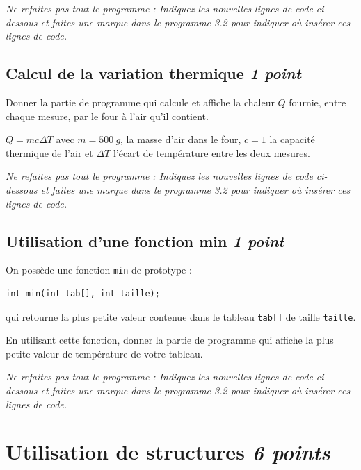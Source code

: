 \textit{Ne refaites pas tout le programme : Indiquez les nouvelles lignes de code ci-dessous et faites une marque dans le programme 3.2 pour indiquer où insérer ces lignes de code.}

\espaceReponse{4cm}

\subsection{Calcul de la variation thermique \hfill \textit{1 point}}

\UPSTIquestion
Donner la partie de programme qui calcule et affiche la chaleur $Q$ fournie, entre chaque mesure, par le four à l'air qu'il contient.


$Q = mc\Delta T$ avec $m = \SI{500}{g}$, la masse d'air dans le four, $c=1$ la capacité thermique de l'air et $\Delta T$ l'écart de température entre les deux mesures.


\textit{Ne refaites pas tout le programme : Indiquez les nouvelles lignes de code ci-dessous et faites une marque dans le programme 3.2 pour indiquer où insérer ces lignes de code.}

\espaceReponse{4cm}

\subsection{Utilisation d'une fonction min \hfill \textit{1 point}}

On possède une fonction \texttt{min} de prototype :
\begin{lstlisting}
int min(int tab[], int taille);
\end{lstlisting}
qui retourne la plus petite valeur contenue dans le tableau \texttt{tab[]} de taille \texttt{taille}.

\UPSTIquestion
En utilisant cette fonction, donner la partie de programme qui affiche la plus petite valeur de température de votre tableau.

\textit{Ne refaites pas tout le programme : Indiquez les nouvelles lignes de code ci-dessous et faites une marque dans le programme 3.2 pour indiquer où insérer ces lignes de code.}

\espaceReponse{3cm}

\ifavecEspaceReponse\pagebreak\fi

\section{Utilisation de structures \hfill \textit{6 points}}

